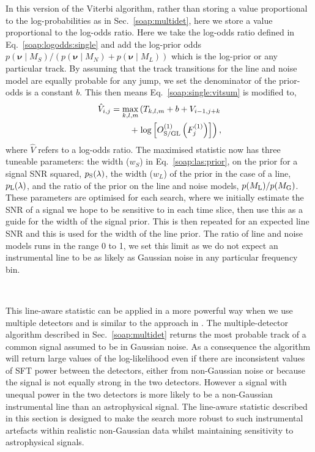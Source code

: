 In this version of the Viterbi algorithm, rather than storing a value proportional to the log-probabilities as in Sec.~\ref{soap:multidet}, here we store a value proportional to the log-odds ratio.
Here we take the log-odds ratio defined in Eq.~\ref{soap:logodds:single} and add the log-prior odds $p(\bm{\nu} \mid M_S)/(p(\bm{\nu} \mid M_N) + p(\bm{\nu} \mid M_L))$ which is the log-prior or any particular track. By assuming that the track transitions for the line and noise model are equally probable for any jump, we set the denominator of the prior-odds is a constant $b$.
This then means Eq.~\ref{soap:single:vitsum} is modified to,
\begin{equation}
\begin{split}
\label{soap:las:stat}
\hat{V}_{i,j} = \max_{k,l,m}\left(T_{k,l,m} + b + V_{i-1,j+k}   \right. \\
 + \left.  \log\left[O^{(1)}_{\rm{S/GL}}\left(F^{(1)}_{j}\right)\right]\right),
\end{split}
\end{equation}
%
where $\hat{V}$ refers to a log-odds ratio.
The maximised statistic now has three tuneable parameters: the width ($w_S$) in Eq.~\ref{soap:las:prior}, on the prior for a signal \gls{SNR} squared, $p_{\rm S}(\lambda)$, the width ($w_L$) of the prior in the case of a line, $p_{\rm L}(\lambda)$, and the ratio of the prior on the line and noise models, $p({M_{\rm L}})/p({M_{\rm G}})$.  These parameters are optimised for each search, where we initially estimate the \gls{SNR} of a signal we hope to be sensitive to in each time slice, then use this as a guide for the width of the signal prior. This is then repeated for an expected line \gls{SNR} and this is used for the width of the line prior. The ratio of line and noise models runs in the range 0 to 1, we set this limit as we do not expect an instrumental line to be as likely as Gaussian noise in any particular frequency bin.


\

%
%
This line-aware statistic can be applied in a more powerful way when we use multiple detectors and is similar to the approach in \cite{keitel2014SearchContinuous}. The multiple-detector algorithm described in Sec.~\ref{soap:multidet} returns the most probable track of a common signal assumed to be in Gaussian noise. As a consequence the algorithm will return large values of the log-likelihood even if there are inconsistent values of \gls{SFT} power between the detectors, either from non-Gaussian noise or because the signal is not equally strong in the two detectors. However a signal with unequal power in the two detectors is more likely to be a non-Gaussian instrumental line than an astrophysical signal. The line-aware statistic described in this section is designed to make the search more robust to such instrumental artefacts within realistic non-Gaussian data whilst maintaining sensitivity to astrophysical signals.

